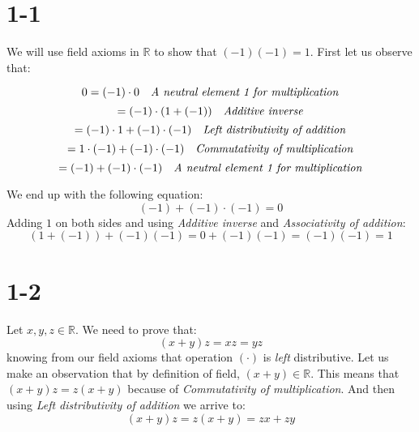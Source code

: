 \documentclass{article}
\begin{document}
\section*{1-1}

We will use field axioms in \(\mathbb{R}\)  to show that \((-1)(-1) = 1\). First let us observe that:

\begin{equation*}
    0 = (-1) \cdot 0  \ \ \ \mbox{\emph{A neutral element 1 for multiplication}}
\end{equation*}
\begin{equation*}
    = (-1) \cdot (1 + (-1)) \ \ \ \mbox{\emph{Additive inverse}}
\end{equation*}
\begin{equation*}
    = (-1) \cdot 1 + (-1) \cdot (-1) \ \ \ \mbox{\emph{Left distributivity of addition}}
\end{equation*}
\begin{equation*}
    = 1 \cdot (-1) + (-1) \cdot (-1) \ \ \ \mbox{\emph{Commutativity of multiplication}}
\end{equation*}
\begin{equation*}
    = (-1) + (-1) \cdot (-1) \ \ \ \mbox{\emph{A neutral element 1 for multiplication}}
\end{equation*}

We end up with the following equation:
\begin{equation*}
    (-1) + (-1) \cdot (-1) = 0
\end{equation*}
Adding \(1\) on both sides and using \emph{Additive inverse} and \emph{Associativity of addition}:
\begin{equation*}
    (1 + (-1)) + (-1)(-1) = 0 + (-1)(-1) = (-1)(-1) = 1
\end{equation*}

\section*{1-2}

Let \(x, y, z \in \mathbb{R}\). We need to prove that:
\begin{equation*}
    (x + y)z = xz = yz
\end{equation*}
knowing from our field axioms that operation \((\cdot)\) is \emph{left} distributive. Let us make an observation
that by definition of field, \( (x + y) \in \mathbb{R}\). This means that \((x+y)z = z(x+y)\) because of \emph{Commutativity of multiplication}.
And then using \emph{Left distributivity of addition} we arrive to:
\begin{equation*}
    (x+y)z = z(x+y) = zx + zy
\end{equation*}
\end{document}
